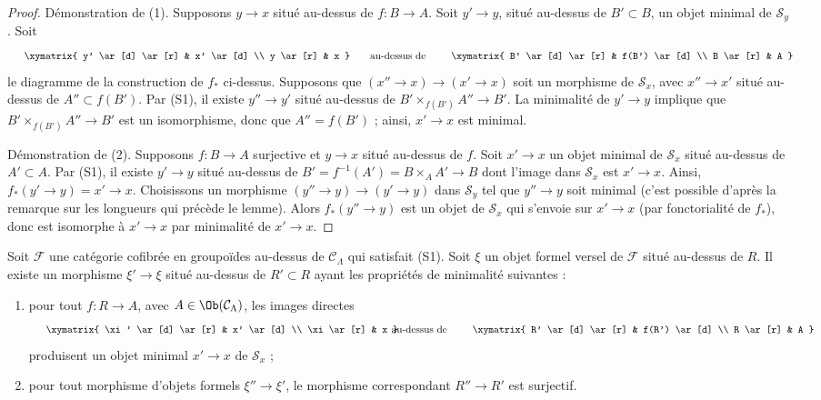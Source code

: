 \begin{proof}
Démonstration de (1). Supposons $y \to x$ situé au-dessus de $f : B \to A$.
Soit $y' \to y$, situé au-dessus de $B' \subset B$, un objet minimal de
$\mathcal{S}_y$. Soit
$$
\vcenter{
\xymatrix{
y' \ar[d] \ar[r] & x' \ar[d] \\
y \ar[r] & x
}
}
\quad\text{au-dessus de}\quad
\vcenter{
\xymatrix{
B' \ar[d] \ar[r] & f(B') \ar[d] \\
B \ar[r] & A
}
}
$$
le diagramme de la construction de $f_*$ ci-dessus. Supposons que
$(x'' \to x) \to (x' \to x)$ soit un morphisme de $\mathcal{S}_x$, avec
$x'' \to x'$ situé au-dessus de $A'' \subset f(B')$. Par (S1), il existe
$y'' \to y'$ situé au-dessus de $B' \times_{f(B')} A'' \to B'$. La
minimalité de $y' \to y$ implique que
$B' \times_{f(B')} A'' \to B'$ est un isomorphisme, donc que
$A'' = f(B')$ ; ainsi, $x' \to x$ est minimal.

\medskip\noindent
Démonstration de (2). Supposons $f : B \to A$ surjective et $y \to x$ situé
au-dessus de $f$. Soit $x' \to x$ un objet minimal de $\mathcal{S}_x$ situé
au-dessus de $A' \subset A$. Par (S1), il existe $y' \to y$ situé au-dessus
de $B' = f^{-1}(A') = B \times_A A' \to B$ dont l'image dans
$\mathcal{S}_x$ est $x' \to x$. Ainsi, $f_*(y' \to y) = x' \to x$.
Choisissons un morphisme $(y'' \to y) \to (y' \to y)$ dans
$\mathcal{S}_y$ tel que $y'' \to y$ soit minimal (c'est possible d'après la
remarque sur les longueurs qui précède le lemme). Alors $f_*(y'' \to y)$ est
un objet de $\mathcal{S}_x$ qui s'envoie sur $x' \to x$ (par fonctorialité de
$f_*$), donc est isomorphe à $x' \to x$ par minimalité de $x' \to x$.
\end{proof}

\begin{lemma}
\label{lemma-smallest-where-descends-versal}
Soit $\mathcal{F}$ une catégorie cofibrée en groupoïdes au-dessus de
$\mathcal{C}_\Lambda$ qui satisfait (S1). Soit $\xi$ un objet formel versel de
$\mathcal{F}$ situé au-dessus de $R$. Il existe un morphisme $\xi' \to \xi$
situé au-dessus de $R' \subset R$ ayant les propriétés de minimalité
suivantes :
\begin{enumerate}
\item pour tout $f : R \to A$, avec $A \in \Ob(\mathcal{C}_\Lambda)$, les
images directes
$$
\vcenter{
\xymatrix{
\xi' \ar[d] \ar[r] & x' \ar[d] \\
\xi \ar[r] & x
}
}
\quad\text{au-dessus de}\quad
\vcenter{
\xymatrix{
R' \ar[d] \ar[r] & f(R') \ar[d] \\
R \ar[r] & A
}
}
$$
produisent un objet minimal $x' \to x$ de $\mathcal{S}_x$ ;
\item pour tout morphisme d'objets formels $\xi'' \to \xi'$, le morphisme
correspondant $R'' \to R'$ est surjectif.
\end{enumerate}
\end{lemma}

